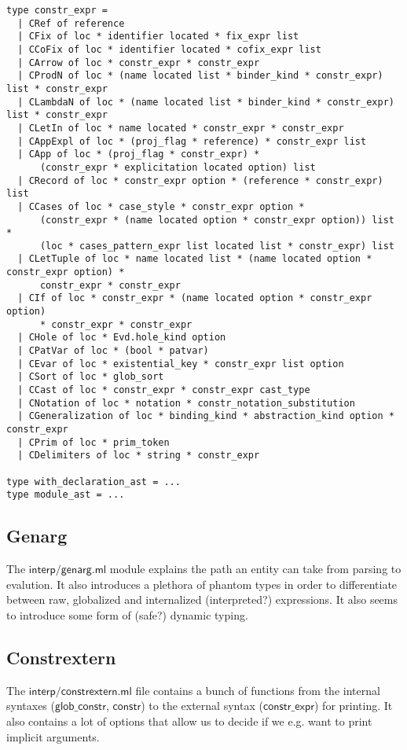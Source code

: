 \documentclass[a4paper,oneside]{book}
\newcommand{\m}[1]{\ensuremath{\mathsf{#1}}}
\begin{document}
\begin{lstlisting}
type constr_expr =
  | CRef of reference
  | CFix of loc * identifier located * fix_expr list
  | CCoFix of loc * identifier located * cofix_expr list
  | CArrow of loc * constr_expr * constr_expr
  | CProdN of loc * (name located list * binder_kind * constr_expr) list * constr_expr
  | CLambdaN of loc * (name located list * binder_kind * constr_expr) list * constr_expr
  | CLetIn of loc * name located * constr_expr * constr_expr
  | CAppExpl of loc * (proj_flag * reference) * constr_expr list
  | CApp of loc * (proj_flag * constr_expr) *
      (constr_expr * explicitation located option) list
  | CRecord of loc * constr_expr option * (reference * constr_expr) list
  | CCases of loc * case_style * constr_expr option *
      (constr_expr * (name located option * constr_expr option)) list *
      (loc * cases_pattern_expr list located list * constr_expr) list
  | CLetTuple of loc * name located list * (name located option * constr_expr option) *
      constr_expr * constr_expr
  | CIf of loc * constr_expr * (name located option * constr_expr option)
      * constr_expr * constr_expr
  | CHole of loc * Evd.hole_kind option
  | CPatVar of loc * (bool * patvar)
  | CEvar of loc * existential_key * constr_expr list option
  | CSort of loc * glob_sort
  | CCast of loc * constr_expr * constr_expr cast_type
  | CNotation of loc * notation * constr_notation_substitution
  | CGeneralization of loc * binding_kind * abstraction_kind option * constr_expr
  | CPrim of loc * prim_token
  | CDelimiters of loc * string * constr_expr

type with_declaration_ast = ...
type module_ast = ...
\end{lstlisting}

\subsection{Genarg}

The \m{interp/genarg.ml} module explains the path an entity can take
from parsing to evalution. It also introduces a plethora of phantom
types in order to differentiate between raw, globalized and
internalized (interpreted?) expressions. It also seems to introduce
some form of (safe?) dynamic typing.

\subsection{Constrextern}

The \m{interp/constrextern.ml} file contains a bunch of functions from
the internal syntaxes (\m{glob\_constr}, \m{constr}) to the external
syntax (\m{constr\_expr}) for printing. It also contains a lot of
options that allow us to decide if we e.g. want to print implicit
arguments.
\end{document}
